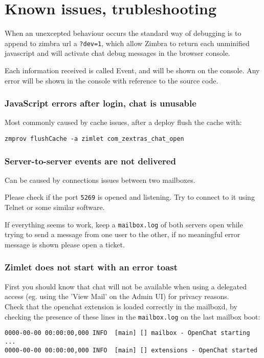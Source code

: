\chapter{Known issues, trubleshooting}

When an unexcepted behaviour occurs the standard way of debugging is to append to zimbra url a \verb+?dev=1+, which allow
Zimbra to return each unminified javascript and will activate chat debug messages in the browser console.

Each information received is called Event, and will be shown on the console. Any error will be shown in the console with
reference to the source code.

\subsection{JavaScript errors after login, chat is unusable}
Most commonly caused by cache issues, after a deploy flush the cache with:
\begin{verbatim}
zmprov flushCache -a zimlet com_zextras_chat_open
\end{verbatim}

\subsection{Server-to-server events are not delivered}
Can be caused by connections issues between two mailboxes.

Please check if the port \verb+5269+ is opened and listening. Try to connect to it using Telnet or some similar software.

If everything seems to work, keep a \verb+mailbox.log+ of both servers open while trying to send a message from one user
to the other, if no meaningful error message is shown please open a ticket.

\subsection{Zimlet does not start with an error toast}
First you should know that chat will not be available when using a delegated access (eg. using the 'View Mail' on the Admin UI)
for privacy reasons.\\

Check that the openchat extension is loaded correctly in the mailboxd, by checking the presence of these lines in the
\verb+mailbox.log+ on the last mailbox boot:
\begin{verbatim}
0000-00-00 00:00:00,000 INFO  [main] [] mailbox - OpenChat starting ...
0000-00-00 00:00:00,000 INFO  [main] [] extensions - OpenChat started
\end{verbatim}
